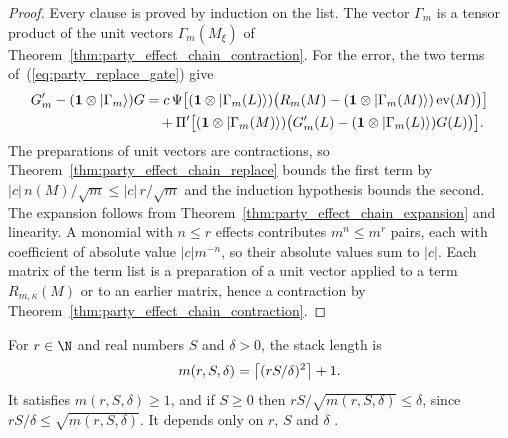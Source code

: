 \begin{proof}\leanok
    Every clause is proved by induction on the list. The vector $\Gamma_m$
    is a tensor product of the unit vectors $\Gamma_m(M_\xi)$ of
    Theorem~\ref{thm:party_effect_chain_contraction}. For the error, the
    two terms of~(\ref{eq:party_replace_gate}) give
    \begin{align}
        G'_m-(\mathbf 1\otimes|\Gamma_m\rangle)G
         & =c\,\Psi\bigl[(\mathbf 1\otimes|\Gamma_m(L)\rangle)
                       \bigl(R_m(M)-(\mathbf 1\otimes|\Gamma_m(M)\rangle)
                       \operatorname{ev}(M)\bigr)\bigr]
        \notag                                                                        \\
         & \quad+\Pi'\bigl[(\mathbf 1\otimes|\Gamma_m(M)\rangle)
                         \bigl(G'_m(L)-(\mathbf 1\otimes|\Gamma_m(L)\rangle)G(L)\bigr)
                         \bigr].
        \notag
    \end{align}
    The preparations of unit vectors are contractions, so
    Theorem~\ref{thm:party_effect_chain_replace} bounds the first term by
    $|c|\,n(M)/\sqrt m\le|c|\,r/\sqrt m$ and the induction hypothesis
    bounds the second. The expansion follows from
    Theorem~\ref{thm:party_effect_chain_expansion} and linearity. A
    monomial with $n\le r$ effects contributes $m^n\le m^r$ pairs, each with
    coefficient of absolute value $|c|m^{-n}$, so their absolute values sum
    to $|c|$. Each matrix of the term list is a preparation of a unit vector
    applied to a term $R_{m,\kappa}(M)$ or to an earlier matrix, hence a
    contraction by Theorem~\ref{thm:party_effect_chain_contraction}.
\end{proof}

\begin{definition}
    \label{def:party_stack_length}
    \leanok
    For $r\in\N$ and real numbers $S$ and $\delta>0$, the stack length is
    \begin{align}
        m(r,S,\delta)=\bigl\lceil(rS/\delta)^2\bigr\rceil+1.
        \notag
    \end{align}
    It satisfies $m(r,S,\delta)\ge1$, and if $S\ge0$ then
    $rS/\sqrt{m(r,S,\delta)}\le\delta$, since
    $rS/\delta\le\sqrt{m(r,S,\delta)}$. It depends only on $r$, $S$ and
    $\delta$ \cite[proof of Theorem~5.2]{OpenAI2026PolynomialPEPS}.
\end{definition}

